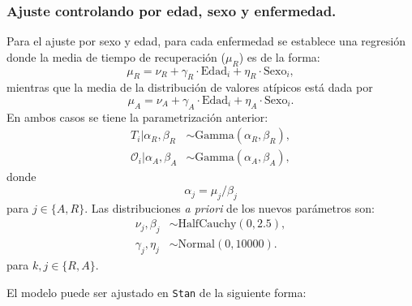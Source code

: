 \documentclass[
]{article}
\begin{document}
\hypertarget{ajuste-controlando-por-edad-sexo-y-enfermedad.}{%
\subsubsection{Ajuste controlando por edad, sexo y
enfermedad.}\label{ajuste-controlando-por-edad-sexo-y-enfermedad.}}

Para el ajuste por sexo y edad, para cada enfermedad se establece una
regresión donde la media de tiempo de recuperación (\(\mu_R\)) es de la
forma: \[
\mu_R = \nu_R + \gamma_R\cdot\textrm{Edad}_i + \eta_R\cdot\textrm{Sexo}_i, 
\] mientras que la media de la distribución de valores atípicos está
dada por \[
\mu_A = \nu_A + \gamma_A\cdot\textrm{Edad}_i + \eta_A\cdot\textrm{Sexo}_i.   
\] En ambos casos se tiene la parametrización anterior: \begin{equation}
\begin{aligned}
T_i|\alpha_R,\beta_R          & \sim \textrm{Gamma}(\alpha_R, \beta_R), \\
\mathcal{O}_i|\alpha_A,\beta_A & \sim \textrm{Gamma}(\alpha_A, \beta_A),
\end{aligned}
\end{equation} donde \[
\alpha_j = \mu_j/\beta_j
\] para \(j \in\{A,R\}\). Las distribuciones \emph{a priori} de los
nuevos parámetros son: \begin{equation}
\begin{aligned}
\nu_j, \beta_j & \sim \textrm{HalfCauchy}(0, 2.5),\\
\gamma_j, \eta_j & \sim \textrm{Normal}(0,10000).
\end{aligned}
\end{equation} para \(k,j \in \{R,A\}\).

El modelo puede ser ajustado en \texttt{Stan} de la siguiente forma:
\end{document}
